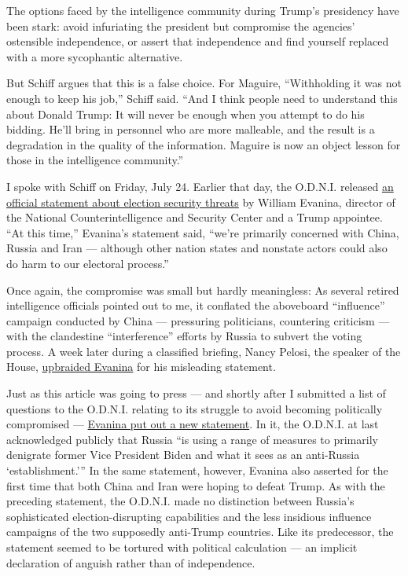 The options faced by the intelligence community during Trump's
presidency have been stark: avoid infuriating the president but
compromise the agencies' ostensible independence, or assert that
independence and find yourself replaced with a more sycophantic
alternative.

But Schiff argues that this is a false choice. For Maguire,
``Withholding it was not enough to keep his job,'' Schiff said. ``And I
think people need to understand this about Donald Trump: It will never
be enough when you attempt to do his bidding. He'll bring in personnel
who are more malleable, and the result is a degradation in the quality
of the information. Maguire is now an object lesson for those in the
intelligence community.''

I spoke with Schiff on Friday, July 24. Earlier that day, the O.D.N.I.
released
\href{https://www.nytimes.com/2020/07/24/us/politics/election-interference-russia-china-iran.html}{an
official statement about election security threats} by William Evanina,
director of the National Counterintelligence and Security Center and a
Trump appointee. ``At this time,'' Evanina's statement said, ``we're
primarily concerned with China, Russia and Iran --- although other
nation states and nonstate actors could also do harm to our electoral
process.''

Once again, the compromise was small but hardly meaningless: As several
retired intelligence officials pointed out to me, it conflated the
aboveboard ``influence'' campaign conducted by China --- pressuring
politicians, countering criticism --- with the clandestine
``interference'' efforts by Russia to subvert the voting process. A week
later during a classified briefing, Nancy Pelosi, the speaker of the
House,
\href{https://www.politico.com/news/2020/07/31/nancy-pelosi-william-evanina-russia-meddling-389847}{upbraided
Evanina} for his misleading statement.

Just as this article was going to press --- and shortly after I
submitted a list of questions to the O.D.N.I. relating to its struggle
to avoid becoming politically compromised ---
\href{https://www.nytimes.com/2020/08/07/us/politics/russia-china-trump-biden-election-interference.html}{Evanina
put out a new statement}. In it, the O.D.N.I. at last acknowledged
publicly that Russia ``is using a range of measures to primarily
denigrate former Vice President Biden and what it sees as an anti-Russia
`establishment.''' In the same statement, however, Evanina also asserted
for the first time that both China and Iran were hoping to defeat Trump.
As with the preceding statement, the O.D.N.I. made no distinction
between Russia's sophisticated election-disrupting capabilities and the
less insidious influence campaigns of the two supposedly anti-Trump
countries. Like its predecessor, the statement seemed to be tortured
with political calculation --- an implicit declaration of anguish rather
than of independence.

